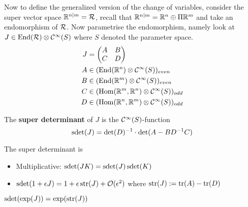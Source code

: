 \begin{rem}
  Now to define the generalized version of the change of variables, consider the super vector space $\mathbb{R}^{n|m} = \mathcal{R}$, recall that $\mathbb{R}^{n|m} = \mathbb{R}^n \oplus \Pi \mathbb{R}^m$ and take an endomorphism of $\mathcal{R}$. Now parametrise the endomorphism, namely look at $J \in \operatorname{End}(\mathcal{R}) \otimes \mathcal{C}^{\infty}(S)$ where $S$ denoted the parameter space.
  \begingroup
    \allowdisplaybreaks
    \begin{align*}
    J &=
    \begin{pmatrix}
      A & B \\
      C & D
    \end{pmatrix} \\
    A &\in (\operatorname{End}(\mathbb{R}^n) \otimes \mathcal{C}^{\infty}(S))_{even} \\
    B &\in (\operatorname{End}(\mathbb{R}^m) \otimes \mathcal{C}^{\infty}(S))_{even} \\
    C &\in (\operatorname{Hom}(\mathbb{R}^m, \mathbb{R}^n) \otimes \mathcal{C}^{\infty}(S))_{odd} \\
    D &\in (\operatorname{Hom}(\mathbb{R}^n, \mathbb{R}^m) \otimes \mathcal{C}^{\infty}(S))_{odd}
    \end{align*}
  \endgroup

  \begin{definition}
    The \textbf{super determinant} of $J$ is the $\mathcal{C}^{\infty}(S)$-function
    $$ \operatorname{sdet}(J) = \det(D)^{-1} \cdot \det(A-BD^{-1} C) $$
  \end{definition}

  \begin{lem}
    The super determinant is
    \begin{itemize}
      \item Multiplicative: $\operatorname{sdet}(JK) = \operatorname{sdet}(J) \operatorname{sdet}(K)$
      \item $\sdet(1 + \epsilon J) = 1 + \epsilon \str(J)+ \OO(\epsilon^2)$ where $\operatorname{str}(J) := \operatorname{tr}(A) - \operatorname{tr}(D)$
    \end{itemize}
  \end{lem}

  \begin{corollary}
    $\operatorname{sdet}(\exp(J)) = \exp(\operatorname{str}(J))$
  \end{corollary}


\end{rem}
